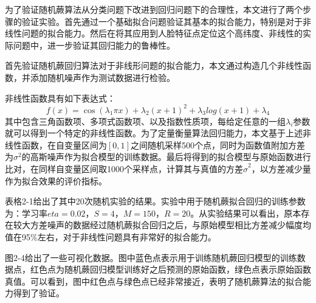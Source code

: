 为了验证随机蕨算法从分类问题下改进到回归问题下的合理性，本文进行了两个步骤的验证实验。首先通过一个基础拟合问题验证其基本的拟合能力，特别是对于非线性问题的拟合能力。然后在将其应用到人脸特征点定位这个高纬度、非线性的实际问题中，进一步验证其回归能力的鲁棒性。


首先验证随机蕨回归算法对于非线形问题的拟合能力，本文通过构造几个非线性函数，并添加随机噪声作为测试数据进行检验。

非线性函数具有如下表达式：
\begin{equation}
	f(x) = \cos(\lambda_1\pi x)+ \lambda_2 (x+1)^2 + \lambda_3 log(x+1) + \lambda_4
\end{equation}
其中包含三角函数项、多项式函数项、以及指数性质项，每给定任意的一组$\lambda_i$参数就可以得到一个特定的非线性函数。为了定量衡量算法回归能力，本文基于上述非线性函数，在自变量区间为$[0,1]$之间随机采样500个点，同时为函数值附加方差为$\sigma^2$的高斯噪声作为拟合模型的训练数据。最后将得到的拟合模型与原始函数进行比对，在同样自变量区间取1000个采样点，计算其与真值的方差$\hat{\sigma}^2$，以方差减少量作为拟合效果的评价指标。

表格2-1给出了其中20次随机实验的结果。实验中用于随机蕨拟合回归的训练参数为：学习率$eta=0.02$，$S=4$，$M=150$，$R=20$。从实验结果可以看出，原本存在较大方差噪声的数据经过随机蕨拟合回归之后，与原始模型相比方差减少幅度均值在95\%左右，对于非线性问题具有非常好的拟合能力。

图2-4给出了一些可视化数据。图中蓝色点表示用于训练随机蕨回归模型的训练数据点，红色点为随机蕨回归模型训练好之后预测的原始函数，绿色点表示原始函数真值。可以看到，图中红色点与绿色点已经非常接近，表明了随机蕨算法的拟合能力得到了验证。

